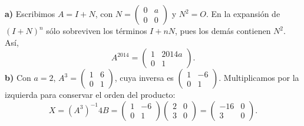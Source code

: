 \textbf{a)} Escribimos $A=I+N$, con $N=\begin{pmatrix}0&a\\0&0\end{pmatrix}$ y $N^2=O$. En la expansión de $(I+N)^n$ sólo sobreviven los términos $I+nN$, pues los demás contienen $N^2$. Así,
\[
A^{2014}=\boxed{\begin{pmatrix}1&2014a\\0&1\end{pmatrix}}.
\]
\textbf{b)} Con $a=2$, $A^3=\begin{pmatrix}1&6\\0&1\end{pmatrix}$, cuya inversa es $\begin{pmatrix}1&-6\\0&1\end{pmatrix}$. Multiplicamos por la izquierda para conservar el orden del producto:
\[
X=(A^3)^{-1}4B
=\begin{pmatrix}1&-6\\0&1\end{pmatrix}\begin{pmatrix}2&0\\3&0\end{pmatrix}
=\boxed{\begin{pmatrix}-16&0\\3&0\end{pmatrix}}.
\]
